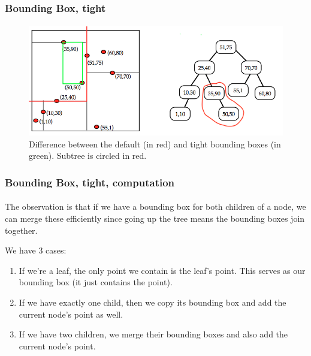 \documentclass{beamer}                             %
\begin{document}
\begin{frame}
\frametitle{Bounding Box, tight}
\framesubtitle{}
\begin{figure}[h!]
  \centering
  \includegraphics[scale=0.4]{bounding_boxes.png}
  \caption{Difference between the default (in red)
and tight bounding boxes (in green). Subtree is circled in red.}
\end{figure}
\end{frame}

\begin{frame}
\frametitle{Bounding Box, tight, computation}
\framesubtitle{}
The observation is that if we have a bounding box for both children of a node,
we can merge these efficiently since going up the tree means the bounding boxes
join together.

We have 3 cases:
\begin{enumerate}
  \item If we're a leaf, the only point we contain is the leaf's point.
    This serves as our bounding box (it just contains the point).
  \item If we have exactly one child, then we copy its bounding box and add
    the current node's point as well.
  \item If we have two children, we merge their bounding boxes and also add
    the current node's point. 
\end{enumerate}
\end{frame}
\end{document}
